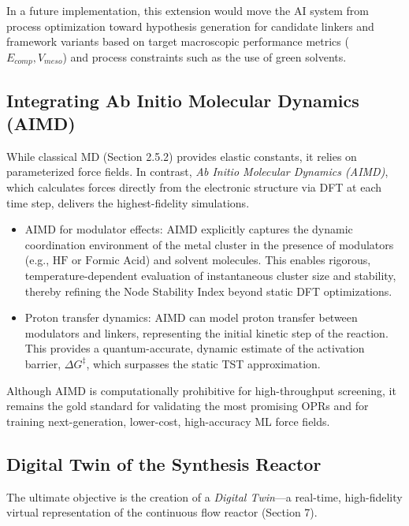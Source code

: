 \documentclass[12pt,a4paper]{article}
\begin{document}
In a future implementation, this extension would move the AI system from process optimization toward hypothesis generation for candidate linkers and framework variants based on target macroscopic performance metrics ($E_{comp}, V_{meso}$) and process constraints such as the use of green solvents.


\subsection{Integrating Ab Initio Molecular Dynamics (AIMD)}

While classical MD (Section 2.5.2) provides elastic constants, it relies on parameterized force fields. In contrast, \textit{Ab Initio Molecular Dynamics (AIMD)}, which calculates forces directly from the electronic structure via DFT at each time step, delivers the highest-fidelity simulations.

\begin{itemize}
    \item AIMD for modulator effects: AIMD explicitly captures the dynamic coordination environment of the metal cluster in the presence of modulators (e.g., $\text{HF}$ or $\text{Formic Acid}$) and solvent molecules. This enables rigorous, temperature-dependent evaluation of instantaneous cluster size and stability, thereby refining the Node Stability Index beyond static DFT optimizations.
    \item Proton transfer dynamics: AIMD can model proton transfer between modulators and linkers, representing the initial kinetic step of the reaction. This provides a quantum-accurate, dynamic estimate of the activation barrier, $\Delta G^\ddagger$, which surpasses the static TST approximation.
\end{itemize}

Although AIMD is computationally prohibitive for high-throughput screening, it remains the gold standard for validating the most promising OPRs and for training next-generation, lower-cost, high-accuracy ML force fields.

\subsection{Digital Twin of the Synthesis Reactor}

The ultimate objective is the creation of a \textit{Digital Twin}—a real-time, high-fidelity virtual representation of the continuous flow reactor (Section 7).
\end{document}

